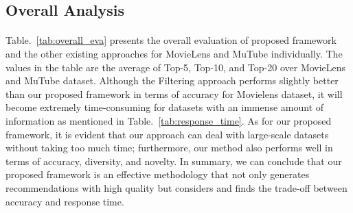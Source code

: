 \documentclass[a4paper,12pt]{report}
\begin{document}
\subsection{Overall Analysis}
\paragraph{}
Table.~\ref{tab:overall_eva} presents the overall evaluation of proposed framework and the other existing approaches for MovieLens and MuTube individually. The values in the table are the average of Top-5, Top-10, and Top-20 over MovieLens and MuTube dataset. Although the Filtering approach performs slightly better than our proposed framework in terms of accuracy for Movielens dataset, it will become extremely time-consuming for datasets with an immense amount of information as mentioned in Table.~\ref{tab:response_time}. As for our proposed framework, it is evident that our approach can deal with large-scale datasets without taking too much time; furthermore, our method also performs well in terms of accuracy, diversity, and novelty. In summary, we can conclude that our proposed framework is an effective methodology that not only generates recommendations with high quality but considers and finds the trade-off between accuracy and response time.
\end{document}
